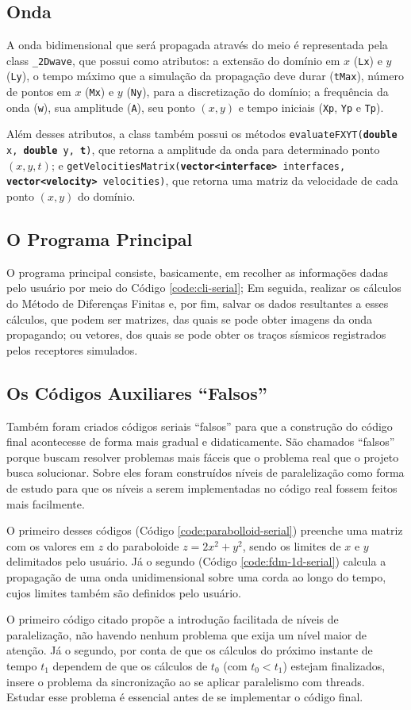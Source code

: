 \subsection{Onda}
A onda bidimensional que será propagada através do meio é representada pela \gls{class} \texttt{\_2Dwave}, que possui como
atributos: a extensão do domínio em $x$ (\texttt{Lx}) e $y$ (\texttt{Ly}), o tempo máximo que a simulação
da propagação deve durar (\texttt{tMax}), número de pontos em $x$ (\texttt{Mx}) e $y$ (\texttt{Ny}), para
a discretização do domínio; a frequência da onda (\texttt{w}), sua amplitude (\texttt{A}), seu ponto $(x, y)$ e tempo iniciais
(\texttt{Xp}, \texttt{Yp} e \texttt{Tp}).

Além desses atributos, a \gls{class} também possui os métodos
\texttt{evaluateFXYT(\textbf{double} x, \textbf{double} y, \textbf{t})}, que retorna a amplitude da onda para determinado ponto
$(x, y, t)$; e \texttt{getVelocitiesMatrix(\textbf{vector<interface>} interfaces, \textbf{vector<velocity>} velocities)},
que retorna uma matriz da velocidade de cada ponto $(x, y)$ do domínio.

\subsection{O Programa Principal}
O programa principal consiste, basicamente, em recolher as informações dadas pelo usuário por meio do Código
\ref{code:cli-serial}; Em seguida, realizar os cálculos do Método de Diferenças Finitas e, por fim, salvar
os dados resultantes a esses cálculos, que podem ser matrizes, das quais se pode obter imagens da onda propagando; ou vetores, dos
quais se pode obter os traços sísmicos registrados pelos receptores simulados.

\subsection{Os Códigos Auxiliares ``Falsos''}
Também foram criados códigos seriais ``falsos'' para que a construção do código final acontecesse de forma mais gradual e didaticamente.
São chamados ``falsos'' porque buscam resolver problemas mais fáceis que o problema real que o projeto busca solucionar. Sobre
eles foram construídos níveis de paralelização como forma de estudo para que os níveis a serem implementadas no código real
fossem feitos mais facilmente.

O primeiro desses códigos (Código \ref{code:parabolloid-serial}) preenche uma matriz com os valores em $z$ do paraboloide $z = 2x^2 + y^2$,
sendo os limites de $x$ e $y$ delimitados pelo usuário. Já o segundo (Código \ref{code:fdm-1d-serial}) calcula a propagação de uma onda
unidimensional sobre uma corda ao longo do tempo, cujos limites também são definidos pelo usuário.

O primeiro código citado propõe a introdução facilitada de níveis de paralelização, não havendo nenhum problema que exija
um nível maior de atenção. Já o segundo, por conta de que os cálculos do próximo instante de tempo $t_1$ dependem de que os cálculos de $t_0$
(com $t_0 < t_1$) estejam finalizados, insere o problema da sincronização ao se aplicar paralelismo com \gls{threads}. Estudar esse problema
é essencial antes de se implementar o código final.

